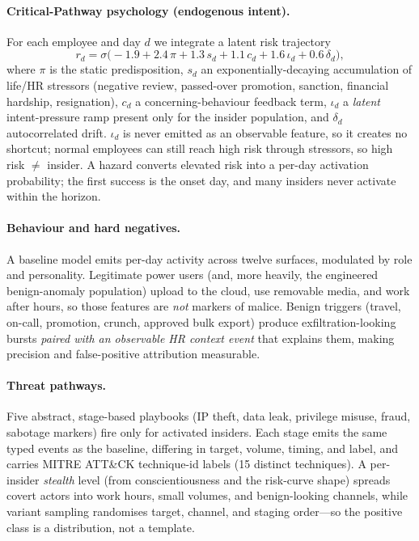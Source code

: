 \documentclass[11pt]{article}
\begin{document}
\paragraph{Critical-Pathway psychology (endogenous intent).}
For each employee and day $d$ we integrate a latent risk trajectory
\begin{equation}
r_d = \sigma\!\big(-1.9 + 2.4\,\pi + 1.3\,s_d + 1.1\,c_d + 1.6\,\iota_d + 0.6\,\delta_d\big),
\end{equation}
where $\pi$ is the static predisposition, $s_d$ an exponentially-decaying accumulation
of life/HR stressors (negative review, passed-over promotion, sanction, financial
hardship, resignation), $c_d$ a concerning-behaviour feedback term, $\iota_d$ a
\emph{latent} intent-pressure ramp present only for the insider population, and
$\delta_d$ autocorrelated drift. $\iota_d$ is never emitted as an observable feature,
so it creates no shortcut; normal employees can still reach high risk through
stressors, so high risk $\neq$ insider. A hazard converts elevated risk into a per-day
activation probability; the first success is the onset day, and many insiders never
activate within the horizon.

\paragraph{Behaviour and hard negatives.} A baseline model emits per-day activity
across twelve surfaces, modulated by role and personality. Legitimate power users
(and, more heavily, the engineered benign-anomaly population) upload to the cloud, use
removable media, and work after hours, so those features are \emph{not} markers of
malice. Benign triggers (travel, on-call, promotion, crunch, approved bulk export)
produce exfiltration-looking bursts \emph{paired with an observable HR context event}
that explains them, making precision and false-positive attribution measurable.

\paragraph{Threat pathways.} Five abstract, stage-based playbooks (IP theft, data
leak, privilege misuse, fraud, sabotage markers) fire only for activated insiders.
Each stage emits the same typed events as the baseline, differing in target, volume,
timing, and label, and carries MITRE ATT\&CK technique-id labels (15 distinct
techniques). A per-insider \emph{stealth} level (from conscientiousness and the
risk-curve shape) spreads covert actors into work hours, small volumes, and
benign-looking channels, while variant sampling randomises target, channel, and
staging order---so the positive class is a distribution, not a template.
\end{document}
